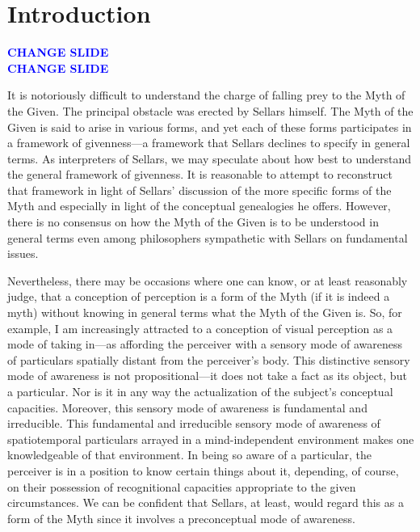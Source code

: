 \documentclass[12pt]{article}
\title{\mytitle}%
\author{\myauthor}
\date{} %
\newcommand{\change}{\textcolor{blue}{\textbf{CHANGE SLIDE}}}
\begin{document}
\maketitle


\setlength{\parindent}{1em}

\section{Introduction} %
\label{sec:introduction}

\change\\
\change

\noindent It is notoriously difficult to understand the charge of falling prey to the Myth of the Given. The principal obstacle was erected by Sellars himself. The Myth of the Given is said to arise in various forms, and yet each of these forms participates in a framework of givenness---a framework that Sellars declines to specify in general terms. As interpreters of Sellars, we may speculate about how best to understand the general framework of givenness. It is reasonable to attempt to reconstruct that framework in light of Sellars' discussion of the more specific forms of the Myth and especially in light of the conceptual genealogies he offers. However, there is no consensus on how the Myth of the Given is to be understood in general terms even among philosophers sympathetic with Sellars on fundamental issues. %

Nevertheless, there may be occasions where one can know, or at least reasonably judge, that a conception of perception is a form of the Myth (if it is indeed a myth) without knowing in general terms what the Myth of the Given is. So, for example, I am increasingly attracted to a conception of visual perception as a mode of taking in---as affording the perceiver with a sensory mode of awareness of particulars spatially distant from the perceiver's body. This distinctive sensory mode of awareness is not propositional---it does not take a fact as its object, but a particular. Nor is it in any way the actualization of the subject's conceptual capacities. Moreover, this sensory mode of awareness is fundamental and irreducible. This fundamental and irreducible sensory mode of awareness of spatiotemporal particulars arrayed in a mind-independent environment makes one knowledgeable of that environment. In being so aware of a particular, the perceiver is in a position to know certain things about it, depending, of course, on their possession of recognitional capacities appropriate to the given circumstances. We can be confident that Sellars, at least, would regard this as a form of the Myth since it involves a preconceptual mode of awareness.
\end{document}
